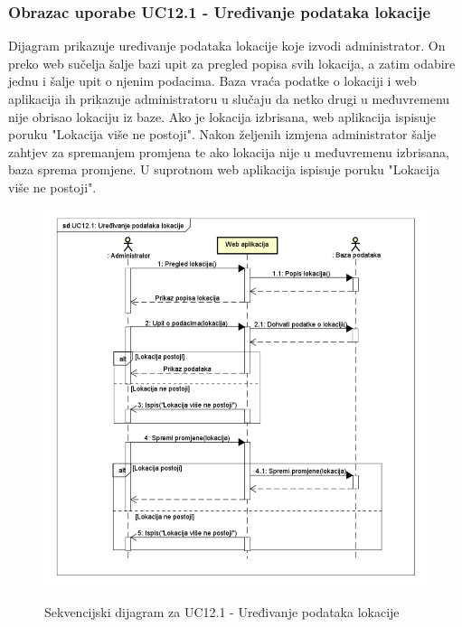 			\subsubsection{Obrazac uporabe UC12.1 - Uređivanje podataka lokacije}
			\textnormal{Dijagram prikazuje uređivanje podataka lokacije koje izvodi administrator. On preko web sučelja šalje bazi upit za pregled popisa svih lokacija, a zatim odabire jednu i šalje upit o njenim podacima. Baza vraća podatke o lokaciji i web aplikacija ih prikazuje administratoru u slučaju da netko drugi u međuvremenu nije obrisao lokaciju iz baze. Ako je lokacija izbrisana, web aplikacija ispisuje poruku "Lokacija više ne postoji". Nakon željenih izmjena administrator šalje zahtjev za spremanjem promjena te ako lokacija nije u međuvremenu izbrisana, baza sprema promjene. U suprotnom web aplikacija ispisuje poruku "Lokacija više ne postoji".}\\
			\begin{figure}[H]
				\centering
				\includegraphics[scale=0.52]{dijagrami/UC12.1} \\
				\caption{Sekvencijski dijagram za UC12.1 - Uređivanje podataka lokacije}
				\label{fig:UC12.1_sekvencijski}
			\end{figure}
		\eject
			

